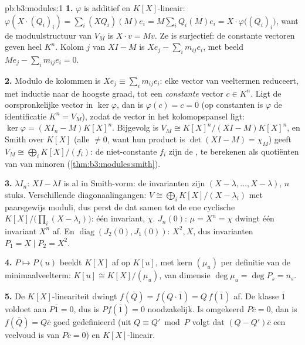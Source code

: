 \begin{solution}{pb:b3:modules:1}
\textbf{1.} $\varphi$ is additief en $K[X]$-lineair: $\varphi(X
\cdot (Q_i)_i) = \sum_i (XQ_i)(M)e_i = M\sum_i Q_i(M)e_i = X \cdot
\varphi\bigl((Q_i)_i\bigr)$, want de moduulstructuur van $V_M$ is
$X \cdot v = Mv$. Ze is surjectief: de constante vectoren geven
heel $K^n$. Kolom $j$ van $XI - M$ is $Xe_j - \sum_i m_{ij}e_i$,
met beeld $Me_j - \sum_i m_{ij}e_i = 0$.

\textbf{2.} Modulo de kolommen is $Xe_j \equiv \sum_i m_{ij}e_i$:
elke vector van veeltermen reduceert, met inductie naar de hoogste
graad, tot een \emph{constante} vector $c \in K^n$. Ligt de
oorspronkelijke vector in $\ker\varphi$, dan is $\varphi(c) = c =
0$ (op constanten is $\varphi$ de identificatie $K^n = V_M$),
zodat de vector in het kolomopspansel ligt: $\ker\varphi = (XI_n -
M)K[X]^n$. Bijgevolg is $V_M \cong K[X]^n/(XI - M)K[X]^n$, en
Smith over $K[X]$ (alle  $\neq 0$, want hun
product is $\det(XI - M) = \chi_M$) geeft $V_M \cong \bigoplus_i
K[X]/(f_i)$: de niet-constante $f_i$ zijn de
, te berekenen als quotiënten van
 van minoren
(\cref{thm:b3:modules:smith}).

\textbf{3.} $\lambda I_n$: $XI - \lambda I$ is al in Smith-vorm:
de invarianten zijn $(X - \lambda, \dots, X - \lambda)$, $n$
stuks. Verschillende diagonaalingangen: $V \cong \bigoplus_i
K[X]/(X - \lambda_i)$ met paarsgewijs  moduli, dus perst
de  dat samen tot de ene cyclische
$K[X]/\bigl(\prod_i(X - \lambda_i)\bigr)$: één invariant, $\chi$.
$J_n(0)$: $\mu = X^n = \chi$ dwingt één invariant $X^n$ af. En
$\operatorname{diag}(J_2(0), J_1(0))$:  $X^2,
X$, dus invarianten $P_1 = X \mid P_2 = X^2$.

\textbf{4.} $P \mapsto P(u)$ beeldt $K[X]$ af op $K[u]$, met kern
$(\mu_u)$ per definitie van de minimaalveelterm: $K[u] \cong
K[X]/(\mu_u)$, van dimensie $\deg\mu_u = \deg P_s = n_s$.

\textbf{5.} De $K[X]$-lineariteit dwingt $f(\bar Q) = f(Q\cdot\bar
1) = Q\,f(\bar 1)$ af. De klasse $\bar 1$ voldoet aan $P \bar 1 =
0$, dus is $P f(\bar 1) = 0$ noodzakelijk. Is omgekeerd $P\bar c =
0$, dan is $f(\bar Q) = Q\bar c$ goed gedefinieerd (uit $Q \equiv
Q' \bmod P$ volgt dat $(Q - Q')\bar c$ een veelvoud is van $P\bar
c = 0$) en $K[X]$-lineair.


\end{solution}
